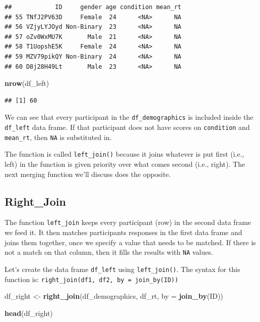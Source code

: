 \documentclass[
]{book}
\newenvironment{Shaded}{\begin{snugshade}}{\end{snugshade}}
\newcommand{\AttributeTok}[1]{\textcolor[rgb]{0.13,0.29,0.53}{#1}}
\newcommand{\FunctionTok}[1]{\textcolor[rgb]{0.13,0.29,0.53}{\textbf{#1}}}
\newcommand{\NormalTok}[1]{#1}
\newcommand{\OtherTok}[1]{\textcolor[rgb]{0.56,0.35,0.01}{#1}}
\begin{document}
\begin{verbatim}
##            ID     gender age condition mean_rt
## 55 TNfJ2PV63D     Female  24      <NA>      NA
## 56 VZjyLYJOyd Non-Binary  23      <NA>      NA
## 57 oZv0WxMU7K       Male  21      <NA>      NA
## 58 T1UopshE5K     Female  24      <NA>      NA
## 59 MZV79pikQY Non-Binary  24      <NA>      NA
## 60 D8j28H49Lt       Male  23      <NA>      NA
\end{verbatim}

\begin{Shaded}
\begin{Highlighting}[]
\FunctionTok{nrow}\NormalTok{(df\_left)}
\end{Highlighting}
\end{Shaded}

\begin{verbatim}
## [1] 60
\end{verbatim}

We can see that every participant in the \texttt{df\_demographics} is included inside the \texttt{df\_left} data frame. If that participant does not have scores on \texttt{condition} and \texttt{mean\_rt}, then \texttt{NA} is substituted in.

The function is called \texttt{left\_join()} because it joins whatever is put first (i.e., left) in the function is given priority over what comes second (i.e., right). The next merging function we'll discuss does the opposite.

\subsection{Right\_Join}\label{right_join}

The function \texttt{left\_join} keeps every participant (row) in the second data frame we feed it. It then matches participants responses in the first data frame and joins them together, once we specify a value that needs to be matched. If there is not a match on that column, then it fills the results with \texttt{NA} values.

Let's create the data frame \texttt{df\_left} using \texttt{left\_join()}. The syntax for this function is: \texttt{right\_join(df1,\ df2,\ by\ =\ join\_by(ID))}

\begin{Shaded}
\begin{Highlighting}[]
\NormalTok{df\_right }\OtherTok{\textless{}{-}} \FunctionTok{right\_join}\NormalTok{(df\_demographics, df\_rt, }\AttributeTok{by =} \FunctionTok{join\_by}\NormalTok{(ID))}

\FunctionTok{head}\NormalTok{(df\_right)}
\end{Highlighting}
\end{Shaded}
\end{document}
